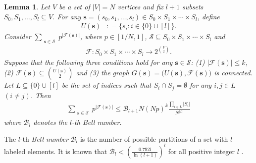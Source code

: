 \documentclass[letterpaper,11pt]{article}
\newtheorem{lemma}[theorem]{Lemma}
\newcommand{\Vsize}{N}
\newcommand{\Vs}{U}
\newcommand{\Es}{F}
\def\defeq{\mathrel{\mathop:}=}%
\begin{document}
\begin{lemma}
\label{lem:technique}
Let $V$ be a set of $|V|=\Vsize$ vertices
and fix $l+1$ subsets $S_0, S_1, \ldots, S_l\subseteq V$. %
For any $\mathbf{s}=(s_0,s_1,\ldots, s_l)\in S_0\times S_1\times \cdots \times S_l$, 
define 
\begin{align*}
U(\mathbf{s})&\defeq \{s_i: i\in \{0\}\cup [l]\}.
\end{align*}
Consider $\sum_{\substack{\mathbf{s}\in \mathcal{S}}}p^{|\mathcal{F}(\mathbf{s})|}$, where 
$p\in [1/\Vsize,1]$, $\mathcal{S}\subseteq S_0\times S_1\times \cdots \times S_l$ and  
\begin{align*}
\mathcal{F}: S_0\times S_1\times \cdots \times S_l \to 2^{\binom{V}{2}}.
\end{align*}
Suppose that the following three conditions hold for any $\mathbf{s}\in \mathcal{S}$:  
(1) $|\mathcal{F}(\mathbf{s})|\leq k$, 
(2) $\mathcal{\Es}(\mathbf{s})\subseteq \binom{U(\mathbf{s})}{2}$ 
and 
(3) the graph $G(\mathbf{s})=\bigl(\Vs(\mathbf{s}), \mathcal{F}(\mathbf{s})\bigr)$ is connected.
Let $L\subseteq \{0\}\cup [l]$ be the set of indices such that $S_i\cap S_j=\emptyset$ for any $i,j\in L$ $(i\neq j)$.
Then
\begin{align*}
\sum_{\substack{\mathbf{s}\in \mathcal{S}}}p^{|\mathcal{F}(\mathbf{s})|}\leq \mathcal{B}_{l+1}\Vsize (\Vsize p)^k\frac{\prod_{i\in L}|S_i|}{\Vsize ^{|L|}}
\end{align*}
where $\mathcal{B}_l$ denotes the $l$-th Bell number.
\end{lemma} 
The $l$-th {\em Bell number} $\mathcal{B}_l$ is the number of possible partitions of a set with $l$ labeled elements. 
It is known that $\mathcal{B}_{l}<\left(\frac{0.792 l}{\ln(l+1)}\right)^l$ for all positive integer $l$ \cite{DT10}.
\end{document}
